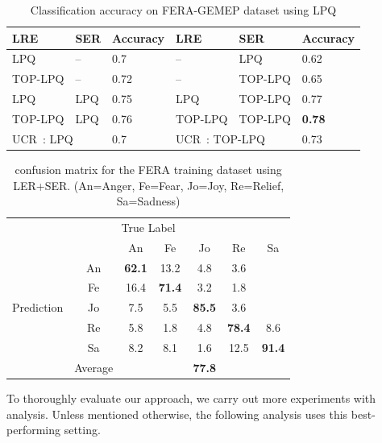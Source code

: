 \documentclass[journal]{IEEEtran}
\begin{document}
\begin{table}[!t]
\caption{Classification accuracy on FERA-GEMEP dataset using LPQ\label{table:comp_lpq}}
\centering
\scriptsize
\begin{tabular}{l|l|l||l|l|l}
\toprule
LRE & SER & Accuracy	& LRE	& SER	& Accuracy \\ \midrule 
LPQ	& --		& 0.7	& -- & LPQ & 0.62 \\
TOP-LPQ & -- & 0.72 & -- & TOP-LPQ & 0.65 \\
LPQ & LPQ & 0.75 & LPQ & TOP-LPQ & 0.77 \\
TOP-LPQ & LPQ & 0.76 & TOP-LPQ & TOP-LPQ & \textbf{0.78} \\ \midrule
\multicolumn{2}{l}{UCR~\cite{Yang_SMCB12}: LPQ} & 0.7 & \multicolumn{2}{l}{UCR~\cite{Yang_SMCB12}: TOP-LPQ} & 0.73 \\
\bottomrule

\end{tabular}
\end{table}




\begin{table}[htbp]
\caption{confusion matrix for the FERA training dataset using LER+SER.
(An=Anger, Fe=Fear, Jo=Joy, Re=Relief, Sa=Sadness)}
\begin{center}
\label{table:mat_fera}
\begin{tabular}{c|c|ccccc|}
\multicolumn{7}{c}{True Label} \\ \cline{2-7}
\multirow{7}{*}{\begin{sideways}Prediction\end{sideways}} && An & Fe & Jo & Re & Sa \\ \cline{2-7}
&An				&\textbf{62.1} &13.2  &4.8  &3.6  &   \\ 
&Fe       &16.4  &\textbf{71.4}  &3.2   &1.8   & \\ 
&Jo       &7.5  &5.5   &\textbf{85.5} &3.6  &    \\ 
&Re       &5.8   &1.8   &4.8   &\textbf{78.4} &8.6    \\ 
&Sa       &8.2   &8.1   &1.6  &12.5 &\textbf{91.4}  \\ \cline{2-7}
&Average  &\multicolumn{5}{c|}{\textbf{77.8}} \\ \cline{2-7}

\end{tabular}
\end{center}
\end{table}


To thoroughly evaluate our approach, we carry out more experiments with analysis. Unless mentioned otherwise, the following analysis uses this best-performing setting. 
\end{document}

